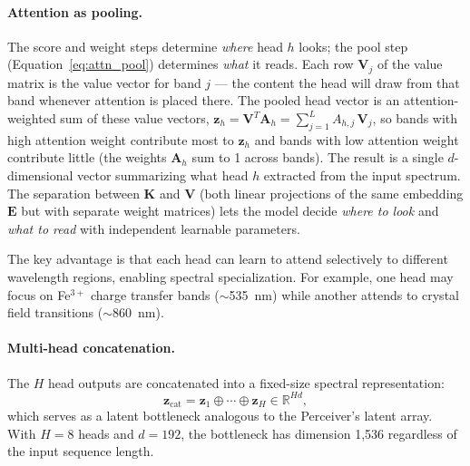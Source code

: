 \documentclass[11pt]{report}
\newcommand{\R}{\mathbb{R}}
\begin{document}
\paragraph{Attention as pooling.}
The score and weight steps determine \emph{where} head $h$ looks; the pool step (Equation~\ref{eq:attn_pool}) determines \emph{what} it reads. Each row $\mathbf{V}_j$ of the value matrix is the value vector for band $j$ --- the content the head will draw from that band whenever attention is placed there. The pooled head vector is an attention-weighted sum of these value vectors, $\mathbf{z}_h = \mathbf{V}^T \mathbf{A}_h = \sum_{j=1}^L A_{h,j}\, \mathbf{V}_j$, so bands with high attention weight contribute most to $\mathbf{z}_h$ and bands with low attention weight contribute little (the weights $\mathbf{A}_h$ sum to 1 across bands). The result is a single $d$-dimensional vector summarizing what head $h$ extracted from the input spectrum. The separation between $\mathbf{K}$ and $\mathbf{V}$ (both linear projections of the same embedding $\mathbf{E}$ but with separate weight matrices) lets the model decide \emph{where to look} and \emph{what to read} with independent learnable parameters.

The key advantage is that each head can learn to attend selectively to different wavelength regions, enabling spectral specialization.
For example, one head may focus on Fe$^{3+}$ charge transfer bands ($\sim$535~nm) while another attends to crystal field transitions ($\sim$860~nm).

\paragraph{Multi-head concatenation.}
The $H$ head outputs are concatenated into a fixed-size spectral representation:
\begin{equation}
\mathbf{z}_{\text{cat}} = \mathbf{z}_1 \oplus \cdots \oplus \mathbf{z}_H \in \R^{Hd},
\label{eq:concat}
\end{equation}
which serves as a latent bottleneck analogous to the Perceiver's latent array. With $H = 8$ heads and $d = 192$, the bottleneck has dimension 1,536 regardless of the input sequence length.
\end{document}
